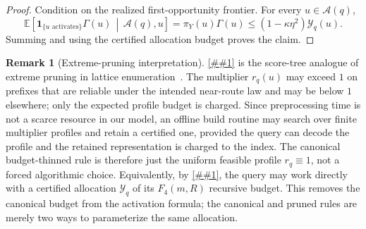 \documentclass[10pt]{article}
\newcommand{\cref}[1]{\ref{##1}}
\newcommand{\Cref}[1]{\ref{##1}}
\theoremstyle{definition}
\newtheorem{remark}[theorem]{Remark}
\newcommand{\E}{\mathbb{E}}
\begin{document}
\begin{proof}
   Condition on the realized first-opportunity frontier. For every
   \(u\in\mathcal A(q)\),
   \[
      \E\!\left[
         \mathbf 1_{\{\text{$u$ activates}\}}\Gamma(u)
         \,\middle|\,\mathcal A(q),u
      \right]
      =
      \pi_Y(u)\Gamma(u)
      \le
      (1-\kappa\eta^2)\mathcal Y_q(u).
   \]
   Summing and using the certified allocation budget proves the claim.
\end{proof}

\begin{remark}[Extreme-pruning interpretation]\label{rem:extreme-pruning-interpretation}
   \Cref{lem:pruned-budget-thinning} is the score-tree analogue of extreme
   pruning in lattice enumeration~\cite{GNR10}. The multiplier \(r_q(u)\) may
   exceed \(1\) on prefixes that are reliable under the intended near-route law
   and may be below \(1\) elsewhere; only the expected profile budget is charged.
   Since preprocessing time is not a scarce resource in our model, an offline
   build routine may search over finite multiplier profiles and retain a
   certified one, provided the query can decode the profile and the retained
   representation is charged to the index. The canonical budget-thinned rule is
   therefore just the uniform feasible profile \(r_q\equiv1\), not a forced
   algorithmic choice.  Equivalently, by
   \cref{lem:budget-allocation-thinning}, the query may work directly with a
   certified allocation \(\mathcal Y_q\) of its \(F_4(m,R)\) recursive budget.
   This removes the canonical budget from the activation formula; the canonical
   and pruned rules are merely two ways to parameterize the same allocation.
\end{remark}
\end{document}
